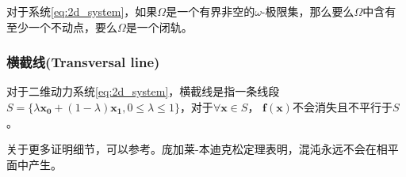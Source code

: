 \begin{thm}
    对于系统\ref{eq:2d_system}，如果$\Omega$是一个有界非空的$\omega$-极限集，那么要么$\Omega$中含有至少一个不动点，要么$\Omega$是一个闭轨。
\end{thm}
\subsubsection{横截线(Transversal line)} 
\begin{defn}[横截线]
    对于二维动力系统\ref{eq:2d_system}，横截线是指一条线段$S=\{\lambda\mathbf{x_0}+(1-\lambda)\mathbf{x_1},0\leq \lambda\leq 1\}$，对于$\forall \mathbf{x}\in S$， $\mathbf{f}(\mathbf{x})$不会消失且不平行于$S$。
\end{defn}
\begin{lem}
    
\end{lem}

关于更多证明细节，可以参考\cite{coddington1956theory}。庞加莱-本迪克松定理表明，混沌永远不会在相平面中产生\cite{strogatz2018nonlinear}。
